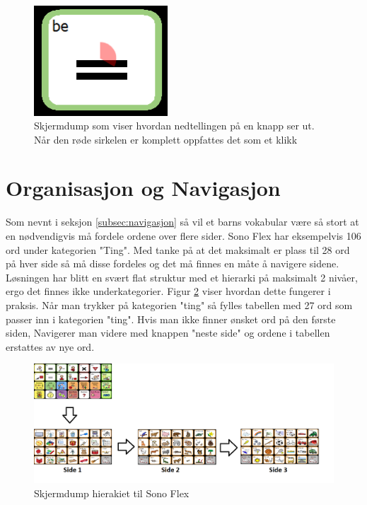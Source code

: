 \documentclass[phd,tocprelim]{cornell}
\begin{document}
\begin{figure}[ht!]
\centering
\includegraphics[width=50mm]{Knapp-interaksjon}
\caption{Skjermdump som viser hvordan nedtellingen på en knapp ser ut. Når den røde sirkelen er komplett oppfattes det som et klikk}
\label{fig:knapp-interaksjon}
\end{figure}


\section{Organisasjon og Navigasjon}

Som nevnt i seksjon \ref{subsec:navigasjon} så vil et barns vokabular være så stort at en nødvendigvis må fordele ordene over flere sider. Sono Flex har eksempelvis 106 ord under kategorien "Ting". Med tanke på at det maksimalt er plass til 28 ord på hver side så må disse fordeles og det må finnes en måte å navigere sidene. Løsningen har blitt en svært flat struktur med et hierarki på maksimalt 2 nivåer, ergo det finnes ikke underkategorier. Figur \ref{fig:hieraki-ting} viser hvordan dette fungerer i praksis. Når man trykker på kategorien "ting" så fylles tabellen med 27 ord som passer inn i kategorien "ting". Hvis man ikke finner ønsket ord på den første siden, Navigerer man videre med knappen "neste side" og ordene i tabellen erstattes av nye ord. 


\begin{figure}[ht!]
\centering
\includegraphics[width=140mm]{Symbgrid}
\caption{Skjermdump hierakiet til Sono Flex}
\label{fig:hieraki-ting}
\end{figure}
\end{document}
